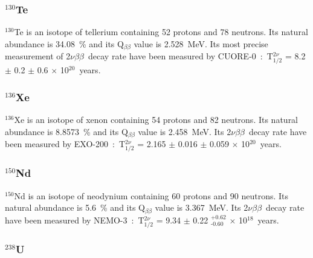 \documentclass[main.tex]{subfiles}
\begin{document}
\subsubsection{$^{\text{130}}$Te}


\NI $^\text{130}$Te is an isotope of tellerium containing 52 protons and 78 neutrons. Its natural abundance is 34.08~\% and its Q$_{\beta\beta}$ value is 2.528~MeV. Its most precise measurement of 2$\nu\beta\beta$~decay rate have been measured by CUORE-0~:~T$_{\text{1/2}}^{\text{2}\nu}$ = 8.2 $\pm$ 0.2 $\pm$ 0.6 $\times$ 10$^{\text{20}}$~years.


\subsubsection{$^{\text{136}}$Xe}


\NI $^\text{136}$Xe is an isotope of xenon containing 54 protons and 82 neutrons. Its natural abundance is 8.8573~\% and its Q$_{\beta\beta}$ value is 2.458~MeV. Its 2$\nu\beta\beta$~decay rate have been measured by EXO-200~:~T$_{\text{1/2}}^{\text{2}\nu}$ = 2.165 $\pm$ 0.016 $\pm$ 0.059 $\times$ 10$^{\text{20}}$~years.


\subsubsection{$^{\text{150}}$Nd}


\NI $^\text{150}$Nd is an isotope of neodynium containing 60 protons and 90 neutrons. Its natural abundance is 5.6~\% and its Q$_{\beta\beta}$ value is 3.367~MeV. Its 2$\nu\beta\beta$~decay rate have been measured by NEMO-3~:~T$_{\text{1/2}}^{\text{2}\nu}$ = 9.34 $\pm$ 0.22 $^{\text{+0.62}}_{\text{-0.60}}$ $\times$ 10$^{\text{18}}$~years.


\subsubsection{$^{\text{238}}$U}
\NI 
\fi



\FloatBarrier












 
\end{document}
